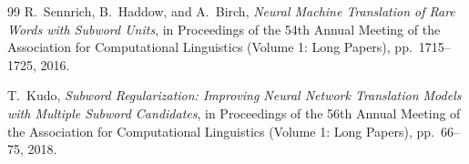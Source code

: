 \documentclass[11pt,a4paper]{article}
\begin{document}
\begin{thebibliography}{99}
R.~Sennrich, B.~Haddow, and A.~Birch,
\textit{Neural Machine Translation of Rare Words with Subword Units},
in Proceedings of the 54th Annual Meeting of the Association for Computational Linguistics (Volume 1: Long Papers), pp.~1715--1725, 2016.

T.~Kudo,
\textit{Subword Regularization: Improving Neural Network Translation Models with Multiple Subword Candidates},
in Proceedings of the 56th Annual Meeting of the Association for Computational Linguistics (Volume 1: Long Papers), pp.~66--75, 2018.

\end{thebibliography}
\end{document}
